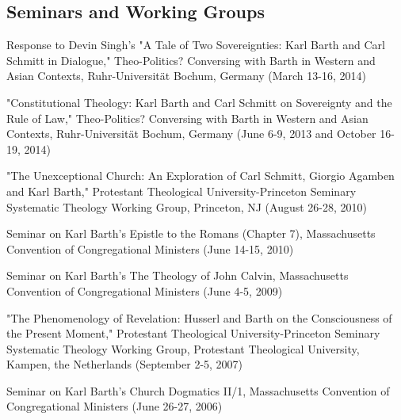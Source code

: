 \documentclass[10pt]{res} %
\begin{document}
\begin{resume}
\section{Seminars and Working Groups}

\begin{hangparas}{.25in}{1}Response to Devin Singh’s "A Tale of Two Sovereignties: Karl Barth and Carl Schmitt in Dialogue," Theo-Politics? Conversing with Barth in Western and Asian Contexts, Ruhr-Universität Bochum, Germany (March 13-16, 2014)\end{hangparas}

\begin{hangparas}{.25in}{1}"Constitutional Theology: Karl Barth and Carl Schmitt on Sovereignty and the Rule of Law," Theo-Politics? Conversing with Barth in Western and Asian Contexts, Ruhr-Universität Bochum, Germany (June 6-9, 2013 and October 16-19, 2014)\end{hangparas}

\begin{hangparas}{.25in}{1}"The Unexceptional Church: An Exploration of Carl Schmitt, Giorgio Agamben and Karl Barth," Protestant Theological University-Princeton Seminary Systematic Theology Working Group, Princeton, NJ (August 26-28, 2010)\end{hangparas}

\begin{hangparas}{.25in}{1}Seminar on Karl Barth’s Epistle to the Romans (Chapter 7), Massachusetts Convention of Congregational Ministers (June 14-15, 2010)\end{hangparas}

\begin{hangparas}{.25in}{1}Seminar on Karl Barth’s The Theology of John Calvin, Massachusetts Convention of Congregational Ministers (June 4-5, 2009)\end{hangparas}

\begin{hangparas}{.25in}{1}"The Phenomenology of Revelation: Husserl and Barth on the Consciousness of the Present Moment," Protestant Theological University-Princeton Seminary Systematic Theology Working Group, Protestant Theological University, Kampen, the Netherlands (September 2-5, 2007)\end{hangparas}

\begin{hangparas}{.25in}{1}Seminar on Karl Barth’s Church Dogmatics II/1, Massachusetts Convention of Congregational Ministers (June 26-27, 2006)\end{hangparas}


\end{resume}
\end{document}
